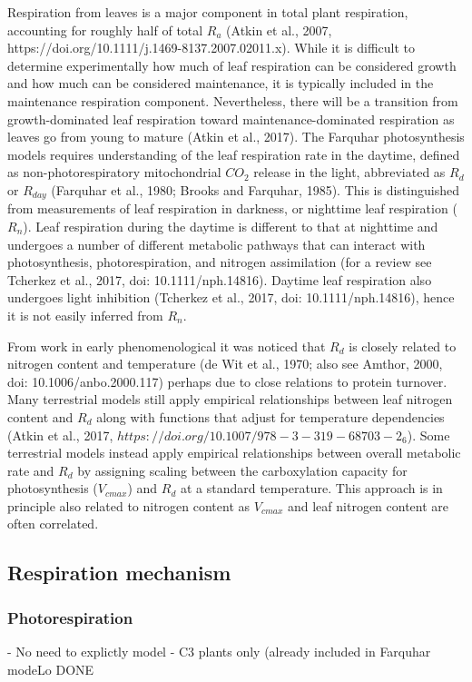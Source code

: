 \documentclass[twoside,10pt]{report}
\begin{document}
Respiration from leaves is a major component in total plant respiration, accounting for roughly half of total $R_a$ (Atkin et al., 2007, https://doi.org/10.1111/j.1469-8137.2007.02011.x). While it is difficult to determine experimentally how much of leaf respiration can be considered growth and how much can be considered maintenance, it is typically included in the maintenance respiration component. Nevertheless, there will be a transition from growth-dominated leaf respiration toward maintenance-dominated respiration as leaves go from young to mature (Atkin et al., 2017). The Farquhar photosynthesis models requires understanding of the leaf respiration rate in the daytime, defined as non-photorespiratory mitochondrial $CO_2$ release in the light, abbreviated as $R_d$ or $R_{day}$ (Farquhar et al., 1980; Brooks and Farquhar, 1985). This is distinguished from measurements of leaf respiration in darkness, or nighttime leaf respiration ($R_n$). Leaf respiration during the daytime is different to that at nighttime and undergoes a number of different metabolic pathways that can interact with photosynthesis, photorespiration, and nitrogen assimilation (for a review see Tcherkez et al., 2017, doi: 10.1111/nph.14816). Daytime leaf respiration also undergoes light inhibition (Tcherkez et al., 2017, doi: 10.1111/nph.14816), hence it is not easily inferred from $R_n$. 

From work in early phenomenological it was noticed that $R_d$ is closely related to nitrogen content and temperature (de Wit et al., 1970; also see Amthor, 2000, doi: 10.1006/anbo.2000.117) perhaps due to close relations to protein turnover. Many terrestrial models still apply empirical relationships between leaf nitrogen content and $R_d$ along with functions that adjust for temperature dependencies (Atkin et al., 2017, $https://doi.org/10.1007/978-3-319-68703-2_6$). Some terrestrial models instead apply empirical relationships between overall metabolic rate and $R_d$ by assigning scaling between the carboxylation capacity for photosynthesis ($V_{cmax}$) and $R_d$ at a standard temperature. This approach is in principle also related to nitrogen content as $V_{cmax}$ and leaf nitrogen content are often correlated. 

\subsection{Respiration mechanism}
\subsubsection{Photorespiration}
- No need to explictly model
- C3 plants only (already included in Farquhar modeLo 
DONE
\end{document}
